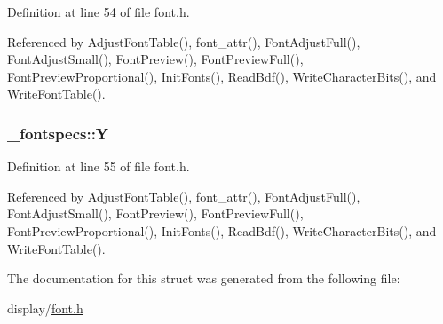 Definition at line 54 of file font.\+h.



Referenced by Adjust\+Font\+Table(), font\+\_\+attr(), Font\+Adjust\+Full(), Font\+Adjust\+Small(), Font\+Preview(), Font\+Preview\+Full(), Font\+Preview\+Proportional(), Init\+Fonts(), Read\+Bdf(), Write\+Character\+Bits(), and Write\+Font\+Table().

\subsubsection[{\texorpdfstring{Y}{Y}}]{ \+\_\+fontspecs\+::Y}\hypertarget{struct__fontspecs_a9771541eab33755d22c804f3bedf8682}{}\label{struct__fontspecs_a9771541eab33755d22c804f3bedf8682}


Definition at line 55 of file font.\+h.



Referenced by Adjust\+Font\+Table(), font\+\_\+attr(), Font\+Adjust\+Full(), Font\+Adjust\+Small(), Font\+Preview(), Font\+Preview\+Full(), Font\+Preview\+Proportional(), Init\+Fonts(), Read\+Bdf(), Write\+Character\+Bits(), and Write\+Font\+Table().



The documentation for this struct was generated from the following file\+:\begin{DoxyCompactItemize}
\item 
display/\hyperlink{display_2font_8h}{font.\+h}\end{DoxyCompactItemize}

